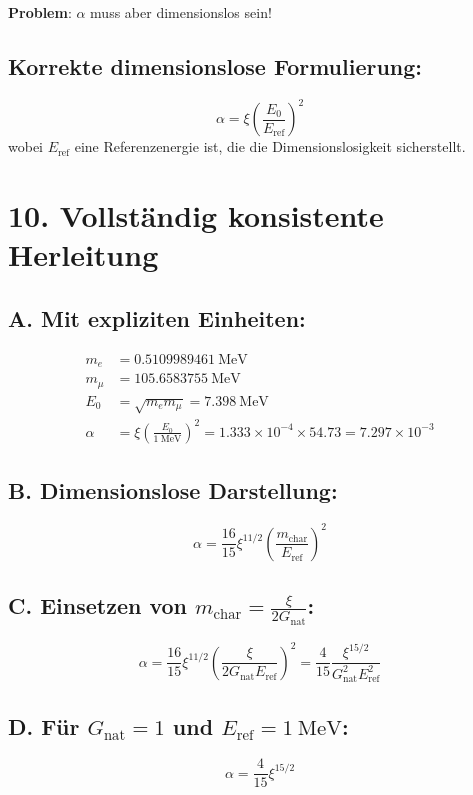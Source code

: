 \documentclass[12pt, a4paper]{article}
\begin{document}
	\textbf{Problem}: $\alpha$ muss aber dimensionslos sein!
	
	\subsection*{Korrekte dimensionslose Formulierung:}
	\[
	\alpha = \xi \left(\frac{E_0}{E_{\text{ref}}}\right)^2
	\]
	wobei $E_{\text{ref}}$ eine Referenzenergie ist, die die Dimensionslosigkeit sicherstellt.
	
	\section*{10. Vollständig konsistente Herleitung}
	
	\subsection*{A. Mit expliziten Einheiten:}
	\begin{align*}
		m_e &= \SI{0.5109989461}{\MeV} \\
		m_\mu &= \SI{105.6583755}{\MeV} \\
		E_0 &= \sqrt{m_e m_\mu} = \SI{7.398}{\MeV} \\
		\alpha &= \xi \left(\frac{E_0}{\SI{1}{\MeV}}\right)^2 = 1.333 \times 10^{-4} \times 54.73 = 7.297 \times 10^{-3}
	\end{align*}
	
	\subsection*{B. Dimensionslose Darstellung:}
	\[
	\boxed{\alpha = \frac{16}{15} \xi^{11/2} \left(\frac{m_{\text{char}}}{E_{\text{ref}}}\right)^2}
	\]
	
	\subsection*{C. Einsetzen von $m_{\text{char}} = \frac{\xi}{2G_{\text{nat}}}$:}
	\[
	\alpha = \frac{16}{15} \xi^{11/2} \left(\frac{\xi}{2G_{\text{nat}} E_{\text{ref}}}\right)^2 = \frac{4}{15} \frac{\xi^{15/2}}{G_{\text{nat}}^2 E_{\text{ref}}^2}
	\]
	
	\subsection*{D. Für $G_{\text{nat}} = 1$ und $E_{\text{ref}} = \SI{1}{\MeV}$:}
	\[
	\alpha = \frac{4}{15} \xi^{15/2}
	\]
	
\end{document}
